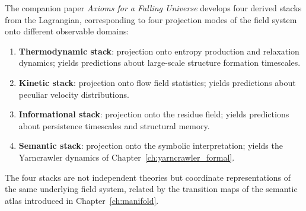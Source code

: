 The companion paper \emph{Axioms for a Falling Universe} develops four derived
stacks from the \RSVP Lagrangian, corresponding to four projection modes of the
field system onto different observable domains:
\begin{enumerate}
  \item \textbf{Thermodynamic stack}: projection onto entropy production and
    relaxation dynamics; yields predictions about large-scale structure formation
    timescales.
  \item \textbf{Kinetic stack}: projection onto flow field statistics; yields
    predictions about peculiar velocity distributions.
  \item \textbf{Informational stack}: projection onto the residue field; yields
    predictions about persistence timescales and structural memory.
  \item \textbf{Semantic stack}: projection onto the symbolic interpretation;
    yields the Yarncrawler dynamics of Chapter~\ref{ch:yarncrawler_formal}.
\end{enumerate}
The four stacks are not independent theories but coordinate representations of
the same underlying field system, related by the transition maps of the semantic
atlas introduced in Chapter~\ref{ch:manifold}.
